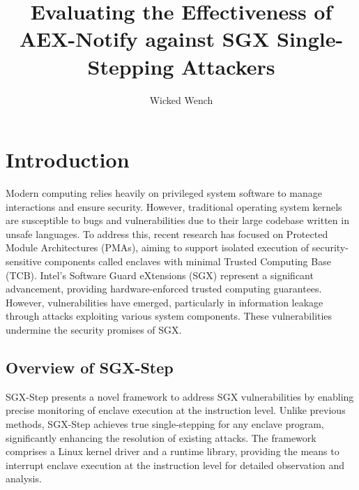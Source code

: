 \documentclass{llncs}
\title{Evaluating the Effectiveness of AEX-Notify against SGX Single-Stepping Attackers}
\author{Wicked Wench}
\institute{	University of L\"ubeck, Germany}
\begin{document}
\maketitle

%


\section{Introduction}


Modern computing relies heavily on privileged system software to manage interactions and ensure security. However, traditional operating system kernels are susceptible to bugs and vulnerabilities due to their large codebase written in unsafe languages. To address this, recent research has focused on Protected Module Architectures (PMAs), aiming to support isolated execution of security-sensitive components called enclaves with minimal Trusted Computing Base (TCB). Intel’s Software Guard eXtensions (SGX) \cite{intel64and,intel2017intel} represent a significant advancement, providing hardware-enforced trusted computing guarantees. However, vulnerabilities have emerged, particularly in information leakage through attacks exploiting various system components. These vulnerabilities undermine the security promises of SGX.

\subsection{Overview of SGX-Step}
SGX-Step presents a novel framework to address SGX vulnerabilities by enabling precise monitoring of enclave execution at the instruction level. Unlike previous methods, SGX-Step achieves true single-stepping for any enclave program, significantly enhancing the resolution of existing attacks. The framework comprises a Linux kernel driver and a runtime library, providing the means to interrupt enclave execution at the instruction level for detailed observation and analysis.
\end{document}
